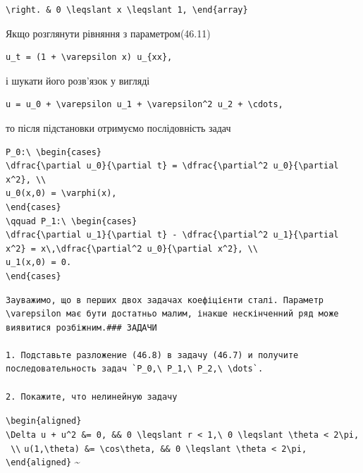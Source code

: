 \documentclass[
  ukrainian,
]{article}
\begin{document}
\begin{verbatim}
\right. & 0 \leqslant x \leqslant 1, \end{array}
\end{verbatim}

Якщо розглянути рівняння з параметром(46.11)

\begin{verbatim}
u_t = (1 + \varepsilon x) u_{xx},
\end{verbatim}

і шукати його розв'язок у вигляді

\begin{verbatim}
u = u_0 + \varepsilon u_1 + \varepsilon^2 u_2 + \cdots,
\end{verbatim}

то після підстановки отримуємо послідовність задач

\begin{verbatim}
P_0:\ \begin{cases}
\dfrac{\partial u_0}{\partial t} = \dfrac{\partial^2 u_0}{\partial x^2}, \\
u_0(x,0) = \varphi(x),
\end{cases}
\qquad P_1:\ \begin{cases}
\dfrac{\partial u_1}{\partial t} - \dfrac{\partial^2 u_1}{\partial x^2} = x\,\dfrac{\partial^2 u_0}{\partial x^2}, \\
u_1(x,0) = 0.
\end{cases}
\end{verbatim}

\begin{verbatim}
Зауважимо, що в перших двох задачах коефіцієнти сталі. Параметр \varepsilon має бути достатньо малим, інакше нескінченний ряд може виявитися розбіжним.### ЗАДАЧИ

1. Подставьте разложение (46.8) в задачу (46.7) и получите последовательность задач `P_0,\ P_1,\ P_2,\ \dots`.

2. Покажите, что нелинейную задачу
\end{verbatim}

\texttt{\textbackslash{}begin\{aligned\}}
\texttt{\textbackslash{}Delta\ u\ +\ u\^{}2\ \&=\ 0,\ \&\&\ 0\ \textbackslash{}leqslant\ r\ \textless{}\ 1,\textbackslash{}\ 0\ \textbackslash{}leqslant\ \textbackslash{}theta\ \textless{}\ 2\textbackslash{}pi,\ \textbackslash{}\textbackslash{}}
\texttt{u(1,\textbackslash{}theta)\ \&=\ \textbackslash{}cos\textbackslash{}theta,\ \&\&\ 0\ \textbackslash{}leqslant\ \textbackslash{}theta\ \textless{}\ 2\textbackslash{}pi,}
\texttt{\textbackslash{}end\{aligned\}}
\textsubscript{}\textasciitilde{}
\end{document}
